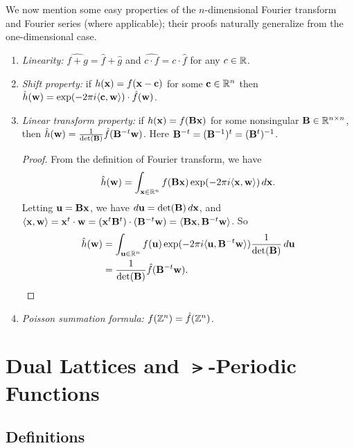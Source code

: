 \documentclass[11pt]{article}
\begin{document}
We now mention some easy properties of the $n$-dimensional Fourier
transform and Fourier series (where applicable); their proofs
naturally generalize from the one-dimensional case.
\begin{enumerate}
\item \emph{Linearity:} $\widehat{f+g} = \hat{f}+\hat{g}$ and
  $\widehat{c \cdot f} = c \cdot \hat{f}$ for any $c \in \mathbb{R}$.
\item \emph{Shift property:} if $h(\mathbf{x}) = f(\mathbf{x} - \mathbf{c})$ for some
  $\mathbf{c} \in \mathbb{R}^{n}$ then
  $\hat{h}(\mathbf{w}) = \exp(-2 \pi i \langle\mathbf{c},\mathbf{w}\rangle) \cdot
  \hat{f}(\mathbf{w})$.
\item \emph{Linear transform property:} if
  $h(\mathbf{x}) = f(\mathbf{B} \mathbf{x})$ for some nonsingular
  $\mathbf{B} \in \mathbb{R}^{n \times n}$, then
  $\hat{h}(\mathbf{w}) = \frac{1}{\det(\mathbf{B})} \hat{f}(\mathbf{B}^{-t}\mathbf{w})$.
  Here $\mathbf{B}^{-t} = (\mathbf{B}^{-1})^t = (\mathbf{B}^{t})^{-1}$.
  \begin{proof}
    From the definition of Fourier transform, we have
    \[ \hat{h}(\mathbf{w}) = \int_{\mathbf{x}\in \mathbb{R}^n} f(\mathbf{B}\mathbf{x})\exp(-2 \pi
      i \langle\mathbf{x},\mathbf{w}\rangle) \, d\mathbf{x}.\] Letting
    $\mathbf{u} = \mathbf{B} \mathbf{x}$, we have $d\mathbf{u} = \det(\mathbf{B}) \, d\mathbf{x}$,
    and
    $\langle\mathbf{x},\mathbf{w}\rangle = \mathbf{x}^t \cdot \mathbf{w} = (\mathbf{x}^t \mathbf{B}^t)
    \cdot (\mathbf{B}^{-t}\mathbf{w}) = \langle\mathbf{B} \mathbf{x}, \mathbf{B}^{-t}\mathbf{w}\rangle$. So
    \begin{align*}
      \hat{h}(\mathbf{w}) &= \int_{\mathbf{u} \in \mathbb{R}^n} f(\mathbf{u})\exp(-2 \pi i \langle\mathbf{u}, \mathbf{B}^{-t}\mathbf{w}\rangle ) \frac{1}{\det(\mathbf{B})} \, d\mathbf{u}  \\
                     &= \frac{1}{\det(\mathbf{B})} \hat{f}(\mathbf{B}^{-t}\mathbf{w}).
    \end{align*}
  \end{proof}

\item \emph{Poisson summation formula:} $f(\mathbb{Z}^{n}) = \hat{f}(\mathbb{Z}^n)$.
\end{enumerate}

\section{Dual Lattices and $\lat$-Periodic Functions}

\subsection{Definitions}
\end{document}
